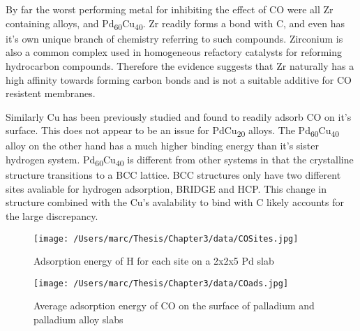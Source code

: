 By far the worst performing metal for inhibiting the effect of CO were all Zr containing alloys, and Pd\textsubscript{60}Cu\textsubscript{40}. Zr readily forms a bond with C, and even has it's own unique branch of chemistry referring to such compounds.\cite{doi:10.1021/cen-v082n016.p036} Zirconium is also a common complex used in homogeneous refactory catalysts for reforming hydrocarbon compounds.\cite{doi:10.1002/9780470504437.ch1} Therefore the evidence suggests that Zr naturally has a high affinity towards forming carbon bonds and is not a suitable additive for CO resistent membranes. 

Similarly Cu has been previously studied and found to readily adsorb CO on it's surface. \cite{doi:10.1021/la950167j} This does not appear to be an issue for PdCu\textsubscript{20} alloys. The Pd\textsubscript{60}Cu\textsubscript{40} alloy on the other hand has a much higher binding energy than it's sister hydrogen system. Pd\textsubscript{60}Cu\textsubscript{40} is different from other systems in that the crystalline structure transitions to a BCC lattice. \cite{She2014} BCC structures only have two different sites avaliable for hydrogen adsorption, BRIDGE and HCP. \cite{C3CP44367A} This change in structure combined with the Cu's avalability to bind with C likely accounts for the large discrepancy. 

\begin{figure}
  \centering
  \texttt{[image: /Users/marc/Thesis/Chapter3/data/COSites.jpg]}
  \caption{Adsorption energy of H for each site on a 2x2x5 Pd slab}
  \label{COsite}
\end{figure}


\begin{landscape}
    \begin{figure}
        \centering
        \texttt{[image: /Users/marc/Thesis/Chapter3/data/COads.jpg]}
        \caption{Average adsorption energy of CO on the surface of palladium and palladium alloy slabs}
        \label{coads}
      \end{figure}
    
    \end{landscape}

